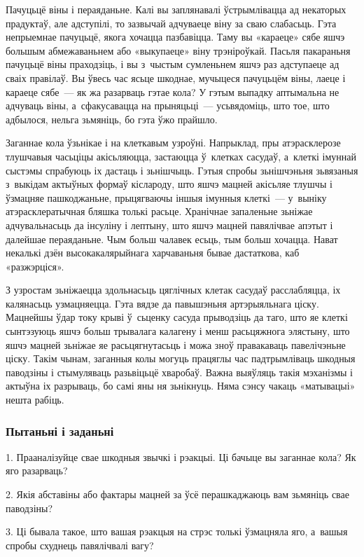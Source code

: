 Пачуцьцё віны і пераяданьне. Калі вы заплянавалі ўстрымлівацца ад некаторых прадуктаў, але адступілі, то зазвычай адчуваеце віну за сваю слабасьць. Гэта непрыемнае пачуцьцё, якога хочацца пазбавіцца. Таму вы «караеце» сябе яшчэ большым абмежаваньнем або «выкупаеце» віну трэніроўкай. Пасьля пакараньня пачуцьцё віны праходзіць, і вы з~чыстым сумленьнем яшчэ раз адступаеце ад сваіх правілаў. Вы ўвесь час ясьце шкоднае, мучыцеся пачуцьцём віны, лаеце і караеце сябе~--- як жа разарваць гэтае кола? У гэтым выпадку аптымальна не адчуваць віны, а~сфакусавацца на прыняцьці~--- усьвядоміць, што тое, што адбылося, нельга зьмяніць, бо гэта ўжо прайшло.

Заганнае кола ўзьнікае і на клеткавым узроўні. Напрыклад, пры атэрасклерозе тлушчавыя часьціцы акісьляюцца, застаюцца ў~клетках сасудаў, а~клеткі імуннай сыстэмы спрабуюць іх дастаць і зьнішчыць. Гэтыя спробы зьнішчэньня зьвязаныя з~выкідам актыўных формаў кіслароду, што яшчэ мацней акісьляе тлушчы і ўзмацняе пашкоджаньне, прыцягваючы іншыя імунныя клеткі~--- у~выніку атэрасклератычная бляшка толькі расьце. Хранічнае запаленьне зьніжае адчувальнасьць да інсуліну і лептыну, што яшчэ мацней павялічвае апэтыт і далейшае пераяданьне. Чым больш чалавек есьць, тым больш хочацца. Нават некалькі дзён высокакалярыйнага харчаваньня бывае дастаткова, каб «разжэрціся».

З узростам зьніжаецца здольнасьць цяглічных клетак сасудаў расслабляцца, іх калянасьць узмацняецца. Гэта вядзе да павышэньня артэрыяльнага ціску. Мацнейшы ўдар току крыві ў~сьценку сасуда прыводзіць да таго, што яе клеткі сынтэзуюць яшчэ больш трывалага калагену і менш расьцяжнога элястыну, што яшчэ мацней зьніжае яе расьцягнутасьць і можа зноў правакаваць павелічэньне ціску. Такім чынам, заганныя колы могуць працяглы час падтрымліваць шкодныя паводзіны і стымуляваць разьвіцьцё хваробаў. Важна выяўляць такія мэханізмы і актыўна іх разрываць, бо самі яны ня зьнікнуць. Няма сэнсу чакаць «матывацыі» нешта рабіць.

\subsubsection{Пытаньні і заданьні}

1. Прааналізуйце свае шкодныя звычкі і рэакцыі. Ці бачыце вы заганнае кола? Як яго разарваць?

2. Якія абставіны або фактары мацней за ўсё перашкаджаюць вам зьмяніць свае паводзіны?

3. Ці бывала такое, што вашая рэакцыя на стрэс толькі ўзмацняла яго, а~вашыя спробы схуднець павялічвалі вагу?

